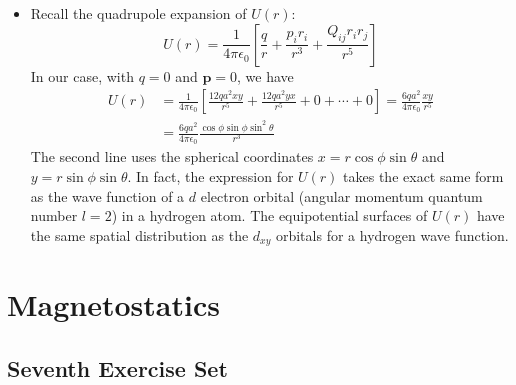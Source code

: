 \documentclass[11pt, a4paper]{article}
\renewcommand{\vec}[1]{\bm{#1}} %
\newcommand{\e}{\epsilon_{0}} %
\begin{document}
\begin{itemize}
	\item Recall the quadrupole expansion of $ U(r) $:
	\begin{equation*}
		U(r) = \frac{1}{4\pi \e} \left[\frac{q}{r} + \frac{p_{i}r_{i}}{r^{3}} + \frac{Q_{ij}r_{i}r_{j}}{r^{5}} \right]
	\end{equation*}
	In our case, with $ q = 0 $ and $ \vec{p} = 0 $, we have
	\begin{align*}
		U(r) &= \frac{1}{4\pi \e} \left[\frac{12qa^{2}xy}{r^{5}} + \frac{12qa^{2}yx}{r^{5}} + 0 + \cdots + 0\right] = \frac{6qa^{2}}{4\pi \e} \frac{xy}{r^{5}}\\
		&=\frac{6qa^{2}}{4\pi \e} \frac{\cos \phi \sin \phi \sin^{2}\theta}{r^{3}}
	\end{align*}
	The second line uses the spherical coordinates $ x = r\cos \phi \sin \theta $ and $ y = r\sin \phi \sin \theta $. In fact, the expression for $ U(r) $ takes the exact same form as the wave function of a $ d $ electron orbital (angular momentum quantum number $ l = 2 $) in a hydrogen atom. The equipotential surfaces of $ U(r) $ have the same spatial distribution as the $ d_{xy} $  orbitals for a hydrogen wave function. 
	
\end{itemize}

\section{Magnetostatics}

\subsection{Seventh Exercise Set}
\end{document}
